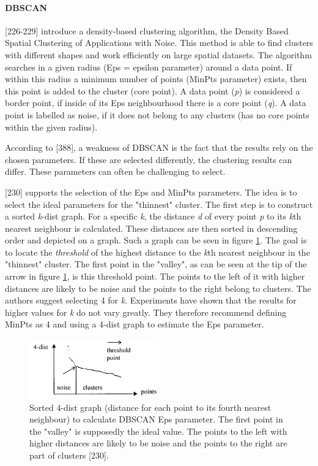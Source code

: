 \paragraph{DBSCAN}
\label{section:DBSCAN}
\textcite{DBSCAN}[226-229] introduce a density-based clustering algorithm, the Density Based Spatial Clustering of Applications with Noise. This method is able to find clusters with different shapes and work efficiently on large spatial datasets. The algorithm searches in a given radius (Eps = epsilon parameter) around a data point. If within this radius a minimum number of points (MinPts parameter) exists, then this point is added to the cluster (core point). A data point (\textit{p}) is considered a border point, if inside of its Eps neighbourhood there is a core point (\textit{q}). A data point is labelled as noise, if it does not belong to any clusters (has no core points within the given radius). 

According to \textcite{han2011data}[388], a weakness of DBSCAN is the fact that the results rely on the chosen parameters. If these are selected differently, the clustering results can differ. These parameters can often be challenging to select.


\textcite{DBSCAN}[230] supports the selection of the Eps and MinPts parameters. The idea is to select the ideal parameters for the "thinnest" cluster. The first step is to construct a sorted \textit{k}-dist graph. For a specific \textit{k}, the distance \textit{d} of every point \textit{p} to its \textit{k}th nearest neighbour is calculated. These distances are then sorted in descending order and depicted on a graph. Such a graph can be seen in figure \ref{figure:sortedKGraphDBSCAN}. The goal is to locate the \textit{threshold} of the highest distance to the \textit{k}th nearest neighbour in the "thinnest" cluster. The first point in the "valley", as can be seen at the tip of the arrow in figure \ref{figure:sortedKGraphDBSCAN}, is this threshold point. The points to the left of it with higher distances are likely to be noise and the points to the right belong to clusters. The authors suggest selecting 4 for \textit{k}. Experiments have shown that the results for higher values for \textit{k} do not vary greatly. They therefore recommend defining MinPts as 4 and using a 4-dist graph to estimate the Eps parameter.


\begin{figure}[h]
  \centering
  \includegraphics[width=0.5\textwidth]{./images/sortedKGraphDBSCAN.png}
  \caption{Sorted 4-dist graph (distance for each point to its fourth nearest neighbour) to calculate DBSCAN Eps parameter. The first point in the "valley" is supposedly the ideal value. The points to the left with higher distances are likely to be noise and the points to the right are part of clusters \autocite{DBSCAN}[230].}
  \label{figure:sortedKGraphDBSCAN}
\end{figure}


